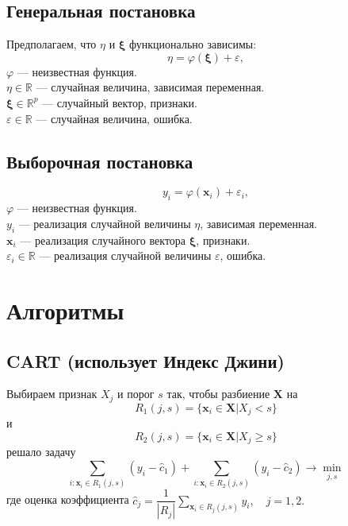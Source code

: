\documentclass{article}
\renewcommand{\geq}{\geqslant}
\theoremstyle{definition}
\theoremstyle{theorem}
\theoremstyle{remark}
\theoremstyle{theorem}
\theoremstyle{example}
\theoremstyle{theorem}
\theoremstyle{theorem}
\theoremstyle{theorem}
\theoremstyle{theorem}
\begin{document}
\subsection{Генеральная постановка}

Предполагаем, что $\eta$ и $\bm{\xi}$ функционально зависимы:
\begin{equation}
	\eta = \varphi(\bm{\xi}) + \varepsilon,
\end{equation}
$\varphi$ --- неизвестная функция.\\
$\eta \in \mathbb{R}$ --- случайная величина, зависимая переменная.\\
$\bm{\xi} \in \mathbb{R}^p$ --- случайный вектор, признаки.\\
$\varepsilon \in \mathbb{R}$ --- случайная величина, ошибка.\\

\subsection{Выборочная постановка}

\begin{equation}
	y_i = \varphi(\textbf{x}_i) + \varepsilon_i,
\end{equation}
\noindent$\varphi$ --- неизвестная функция.\\
$y_i$ --- реализация случайной величины $\eta$, зависимая переменная.\\
$\textbf{x}_i$ --- реализация случайного вектора $\bm{\xi}$, признаки.\\
$\varepsilon_i \in \mathbb{R}$ --- реализация случайной величины $\varepsilon$, ошибка.\\

\newpage

\section{Алгоритмы}

\subsection{CART (использует Индекс Джини)}

\noindent Выбираем признак $X_j$ и порог $s$ так, чтобы разбиение $\textbf{X}$ на
$$R_1(j,s) = \{ \textbf{x}_i \in \textbf{X} | X_j < s \}$$
и
$$R_2(j,s) = \{ \textbf{x}_i \in \textbf{X} | X_j \geq s \}$$
решало задачу
\begin{equation}
	\sum\limits_{i:\textbf{x}_i \in R_1 (j,s)} (y_i - \hat{c}_1) + 	\sum\limits_{i:\textbf{x}_i \in R_2 (j,s)} (y_i - \hat{c}_2) \to \min_{j,s}
\end{equation}
где оценка коэффициента $\hat{c}_j = \dfrac{1}{|R_j|} \sum\limits_{\textbf{x}_i \in R_j(j,s)} y_i, \quad j = 1,2.$\\
\end{document}
